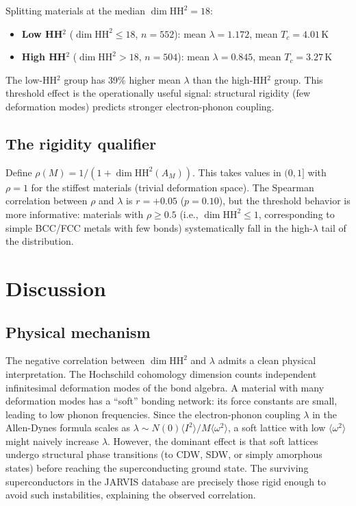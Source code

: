 \documentclass[12pt,a4paper]{article}
\newcommand{\HH}{\mathrm{HH}}
\begin{document}
Splitting materials at the median $\dim\HH^2 = 18$:
\begin{itemize}
  \item \textbf{Low HH$^2$} ($\dim\HH^2 \leq 18$, $n = 552$):
    mean $\lambda = 1.172$, mean $T_c = 4.01$\,K
  \item \textbf{High HH$^2$} ($\dim\HH^2 > 18$, $n = 504$):
    mean $\lambda = 0.845$, mean $T_c = 3.27$\,K
\end{itemize}
The low-HH$^2$ group has 39\% higher mean $\lambda$ than the
high-HH$^2$ group. This threshold effect is the operationally
useful signal: structural rigidity (few deformation modes)
predicts stronger electron-phonon coupling.

\subsection{The rigidity qualifier}

Define $\rho(M) = 1/(1 + \dim\HH^2(A_M))$. This takes values in
$(0, 1]$ with $\rho = 1$ for the stiffest materials (trivial
deformation space). The Spearman correlation between $\rho$ and
$\lambda$ is $r = +0.05$ ($p = 0.10$), but the threshold behavior
is more informative: materials with $\rho \geq 0.5$ (i.e.,
$\dim\HH^2 \leq 1$, corresponding to simple BCC/FCC metals with
few bonds) systematically fall in the high-$\lambda$ tail of the
distribution.

\section{Discussion}
\label{sec:discussion}

\subsection{Physical mechanism}

The negative correlation between $\dim\HH^2$ and $\lambda$ admits a
clean physical interpretation. The Hochschild cohomology dimension
counts independent infinitesimal deformation modes of the bond
algebra. A material with many deformation modes has a ``soft''
bonding network: its force constants are small, leading to low phonon
frequencies. Since the electron-phonon coupling $\lambda$ in the
Allen-Dynes formula scales as $\lambda \sim N(0)\langle I^2\rangle /
M\langle\omega^2\rangle$, a soft lattice with low
$\langle\omega^2\rangle$ might naively increase $\lambda$. However,
the dominant effect is that soft lattices undergo structural phase
transitions (to CDW, SDW, or simply amorphous states) before reaching
the superconducting ground state. The surviving superconductors in
the JARVIS database are precisely those rigid enough to avoid such
instabilities, explaining the observed correlation.
\end{document}
